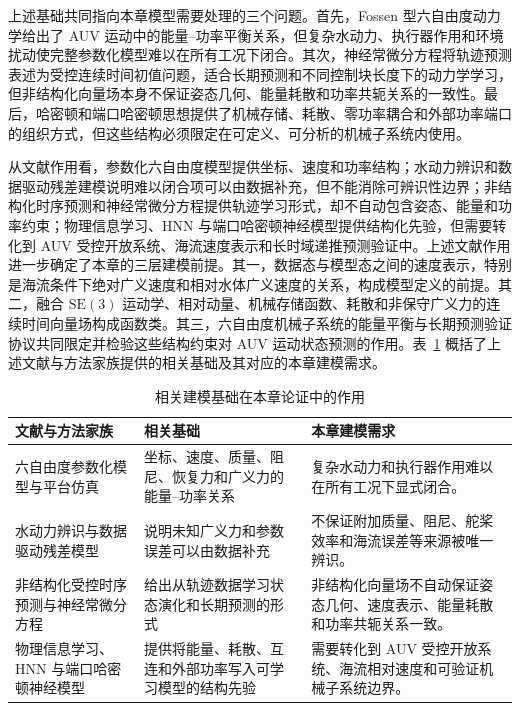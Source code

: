 \documentclass[UTF8,zihao=-4]{ctexrep}
\newcommand{\SE}{\mathrm{SE}}
\begin{document}
上述基础共同指向本章模型需要处理的三个问题。首先，Fossen 型六自由度动力学给出了 AUV 运动中的能量--功率平衡关系，但复杂水动力、执行器作用和环境扰动使完整参数化模型难以在所有工况下闭合。其次，神经常微分方程将轨迹预测表述为受控连续时间初值问题，适合长期预测和不同控制块长度下的动力学学习，但非结构化向量场本身不保证姿态几何、能量耗散和功率共轭关系的一致性。最后，哈密顿和端口哈密顿思想提供了机械存储、耗散、零功率耦合和外部功率端口的组织方式，但这些结构必须限定在可定义、可分析的机械子系统内使用。

从文献作用看，参数化六自由度模型提供坐标、速度和功率结构；水动力辨识和数据驱动残差建模说明难以闭合项可以由数据补充，但不能消除可辨识性边界；非结构化时序预测和神经常微分方程提供轨迹学习形式，却不自动包含姿态、能量和功率约束；物理信息学习、HNN 与端口哈密顿神经模型提供结构化先验，但需要转化到 AUV 受控开放系统、海流速度表示和长时域递推预测验证中。上述文献作用进一步确定了本章的三层建模前提。其一，数据态与模型态之间的速度表示，特别是海流条件下绝对广义速度和相对水体广义速度的关系，构成模型定义的前提。其二，融合 \(\SE(3)\) 运动学、相对动量、机械存储函数、耗散和非保守广义力的连续时间向量场构成函数类。其三，六自由度机械子系统的能量平衡与长期预测验证协议共同限定并检验这些结构约束对 AUV 运动状态预测的作用。表~\ref{tab:literature-role-map} 概括了上述文献与方法家族提供的相关基础及其对应的本章建模需求。

\begin{table}[htbp]
  \centering
  \caption{相关建模基础在本章论证中的作用}
  \label{tab:literature-role-map}
  \begin{tabularx}{\textwidth}{>{\raggedright\arraybackslash}p{}>{\raggedright\arraybackslash}p{}>{\raggedright\arraybackslash}X}
    \toprule
    文献与方法家族 & 相关基础 & 本章建模需求 \\
    \midrule
    六自由度参数化模型与平台仿真 & 坐标、速度、质量、阻尼、恢复力和广义力的能量--功率关系 & 复杂水动力和执行器作用难以在所有工况下显式闭合。 \\
    水动力辨识与数据驱动残差模型 & 说明未知广义力和参数误差可以由数据补充 & 不保证附加质量、阻尼、舵桨效率和海流误差等来源被唯一辨识。 \\
    非结构化受控时序预测与神经常微分方程 & 给出从轨迹数据学习状态演化和长期预测的形式 & 非结构化向量场不自动保证姿态几何、速度表示、能量耗散和功率共轭关系一致。 \\
    物理信息学习、HNN 与端口哈密顿神经模型 & 提供将能量、耗散、互连和外部功率写入可学习模型的结构先验 & 需要转化到 AUV 受控开放系统、海流相对速度和可验证机械子系统边界。 \\
    \bottomrule
  \end{tabularx}
\end{table}
\end{document}
